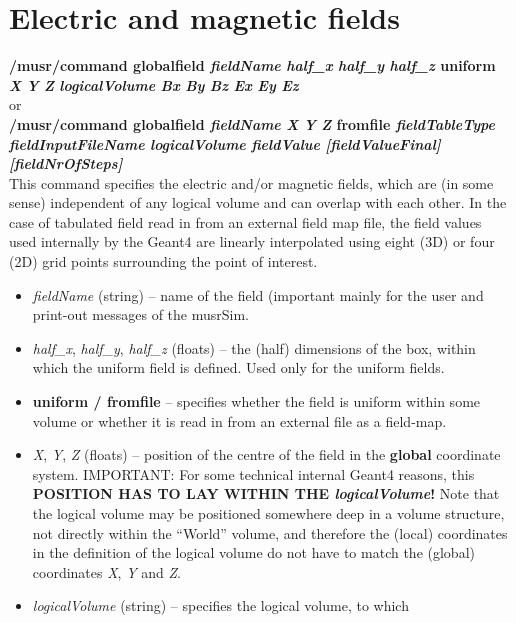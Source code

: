 \documentclass[twoside]{dis04}
\begin{document}
\section{Electric and magnetic fields}
\begin{description}
\item{\bf /musr/command globalfield \emph{fieldName} \emph{half\_x} \emph{half\_y} \emph{half\_z} uniform 
	\emph{X} \emph{Y} \emph{Z} \emph{logicalVolume} \emph{Bx} \emph{By} \emph{Bz} \emph{Ex} \emph{Ey} \emph{Ez}} \\
	or \\
	{\bf /musr/command globalfield \emph{fieldName} \emph{X} \emph{Y} \emph{Z} fromfile
	\emph{fieldTableType} \emph{fieldInputFileName} \emph{logicalVolume} \emph{fieldValue} 
	\emph{[fieldValueFinal]} \emph{[fieldNrOfSteps]}} \\
	This command specifies the electric and/or magnetic fields, which are (in some sense)
	independent of any logical volume and can overlap with each other.
	In the case of tabulated field read in from an external field map file, the
	field values used internally by the Geant4 are linearly interpolated using
	eight (3D) or four (2D) grid points surrounding the point of interest.
%
	\begin{itemize}
	   \item \emph{fieldName} (string) -- name of the field (important mainly for the user and 
		print-out messages of the musrSim.
	   \item \emph{half\_x}, \emph{half\_y}, \emph{half\_z} (floats) -- the (half) dimensions
		of the box, within which the uniform field is defined.  Used only for the uniform fields.
	   \item {\bf uniform / fromfile} -- specifies whether the field is uniform within
		some volume or whether it is read in from an external file as a field-map.
	   \item \emph{X}, \emph{Y}, \emph{Z} (floats) -- position of the centre of the field
		in the {\bf global} coordinate system. IMPORTANT: For some technical internal
		Geant4 reasons, this {\bf POSITION HAS TO LAY WITHIN THE \emph{logicalVolume}!}
		Note that the logical volume may be positioned somewhere deep in a volume
                structure, not directly within the ``World'' volume, and
		therefore the (local) coordinates in the definition of the logical volume
		do not have to match the (global) coordinates \emph{X}, \emph{Y} and \emph{Z}.
	   \item \emph{logicalVolume} (string) -- specifies the logical volume, to which

\end{itemize}
\end{description}
\end{document}
